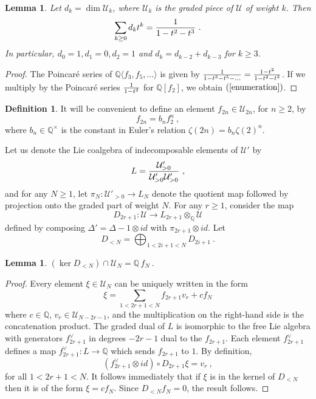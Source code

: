 \documentclass[10pt]{amsart}
\newtheorem{lem}[thm]{Lemma}
\theoremstyle{definition}
\newtheorem{defn}[thm]{Definition}
\theoremstyle{remark}
\numberwithin{equation}{section}
\newcommand{\Q}{\mathbb Q}
\newcommand{\U}{\mathcal{U}}
\newcommand{\To}{\longrightarrow}
\begin{document}
 \begin{lem} Let $d_k=\dim \U_k$, where $\U_k$ is the graded piece of $\U$ of weight $k$.  Then
\begin{equation} \label{enumeration} 
\sum_{k\geq 0} d_k t^k = {1\over  1-t^2-t^3}\ . \end{equation}
In particular, $d_0=1, d_1=0, d_2=1$ and  $d_k= d_{k-2}+d_{k-3}$ for $k\geq 3$.
\end{lem} 
\begin{proof} The Poincar\'e series of $\Q\langle f_3,f_5, \ldots \rangle$ is given by 
${1\over 1-t^3-t^5-\ldots } = {1-t^2 \over 1-t^2-t^3}$.
If we multiply by the Poincar\'e series ${1\over 1-t^2}$  for $\Q[f_2]$, we obtain $(\ref{enumeration})$.
\end{proof}
 \begin{defn} \label{defnFNnotation} It will be convenient to define an element $f_{2n} \in \U_{2n}$, for $n\geq 2$, by  
 $$f_{2n}=b_n f_2^n \ , $$where $b_n \in \Q^{\times}$ is the constant in Euler's relation $\zeta(2n)=b_n \zeta(2)^n$. 
\end{defn}
 
 Let us denote the Lie coalgebra of indecomposable elements of $\U'$ by
 \begin{equation} \label{Lnotcurlydefn}
 L= {\U'_{>0}\over \U'_{>0} \U'_{>0} }\ ,
 \end{equation}
and  for any $N\geq 1$, let $\pi_{N}: \U'_{>0}\rightarrow  L_N$ denote the quotient map followed by projection onto the graded part of weight $N$.
For any $r\geq 1$,    consider the map
   \begin{equation} \label{UDr} D_{2r+1}: \U  \To L_{2r+1} \otimes_{\Q} \U \end{equation}
 defined by composing $\Delta'= \Delta - 1\otimes id$ with $\pi_{2r+1}\otimes id$. Let
 \begin{equation} \label{UDltN} D_{<N}=\bigoplus_{1 < 2i+1< N} D_{2i+1} \ . 
 \end{equation}
 
 \begin{lem} \label{lemkerDonU} $(\ker D_{<N}) \cap \U_N = \Q\, f_N\ .$
 \end{lem}
 \begin{proof} Every element $\xi \in \U_N$ can be uniquely written in the form
 $$\xi = \sum_{1< 2r+1 < N} f_{2r+1} v_r + c f_N$$
 where $c\in \Q$,  $v_r \in \U_{N-2r-1}$, and the multiplication on the right-hand side is the concatenation product. The graded dual of $L$ is isomorphic to the free Lie algebra with generators $f^{\vee}_{2r+1}$ in degrees $-2r-1$ dual to the $f_{2r+1}$.  Each element $f^{\vee}_{2r+1}$
 defines a map $f^{\vee}_{2r+1}: L \rightarrow \Q$ which sends $f_{2r+1}$ to $1$.
  By definition, 
 $$(f^{\vee}_{2r+1} \otimes id )\circ D_{2r+1} \xi = v_r\ ,$$
 for all $1<2r+1<N$. It follows immediately that if $\xi$ is in the kernel of $D_{<N}$ then it is of the form $\xi = cf_N$. Since $D_{<N} f_N=0$, the result follows.
 \end{proof}
\end{document}
